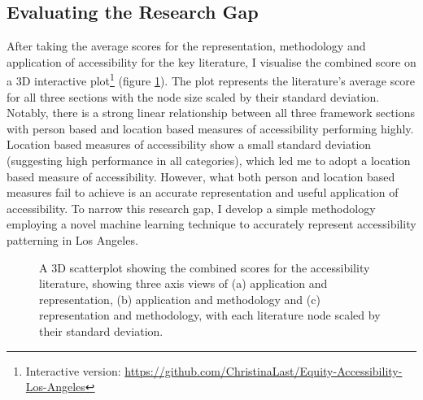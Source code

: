 \documentclass[a4paper,UKenglish]{lipics-v2018}
\begin{document}
\subsection{Evaluating the Research Gap}
After taking the average scores for the representation, methodology and application of accessibility for the key literature, I visualise the combined score on a 3D interactive plot\footnote{Interactive version: \url{https://github.com/ChristinaLast/Equity-Accessibility-Los-Angeles}} (figure \ref{fig:Literature_matrix}). The plot represents the literature’s average score for all three sections with the node size scaled by their standard deviation. Notably, there is a strong linear relationship between all three framework sections with person based and location based measures of accessibility performing highly. Location based measures of accessibility show a small standard deviation (suggesting high performance in all categories), which led me to adopt a location based measure of accessibility. However, what both person and location based measures fail to achieve is an accurate representation and useful application of accessibility. To narrow this research gap, I develop a simple methodology employing a novel machine learning technique to accurately represent accessibility patterning in Los Angeles.\begin{figure}[ht]
    \centering
    \caption[Combined 3D scatterplot]{A 3D scatterplot showing the combined scores for the accessibility literature, showing three axis views of (a) application and representation, (b) application and methodology and (c) representation and methodology, with each literature node scaled by their standard deviation.} 
    \label{fig:Literature_matrix}
\end{figure}
\end{document}
